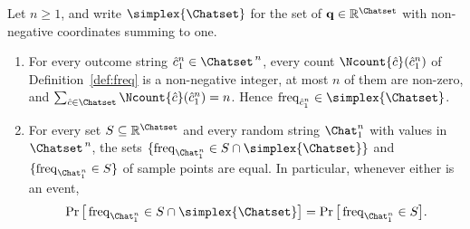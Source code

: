 
\begin{lemma}\label{lem:freq-in-simplex}
Let $n\ge1$, and write $\simplex{\Chatset}$ for the set of
$\mathbf{q}\in\mathbb{R}^{\Chatset}$ with non-negative coordinates summing
to one.
\begin{enumerate}[label=(\roman*),leftmargin=2.2em]
\item For every outcome string $\hat c_1^n\in\Chatset^{\,n}$, every count
$\Ncount{\hat c}(\hat c_1^n)$ of Definition~\ref{def:freq} is a non-negative
integer, at most $n$ of them are non-zero, and
$\sum_{\hat c\in\Chatset}\Ncount{\hat c}(\hat c_1^n)=n$. Hence
$\operatorname{freq}_{\hat c_1^n}\in\simplex{\Chatset}$.
\item For every set $S\subseteq\mathbb{R}^{\Chatset}$ and every random string
$\Chat_1^n$ with values in $\Chatset^{\,n}$, the sets
$\{\operatorname{freq}_{\Chat_1^n}\in S\cap\simplex{\Chatset}\}$ and
$\{\operatorname{freq}_{\Chat_1^n}\in S\}$ of sample points are equal. In
particular, whenever either is an event,
\begin{equation}\label{eq:simplex-free}
  \Pr\big[\operatorname{freq}_{\Chat_1^n}\in S\cap\simplex{\Chatset}\big]
  =\Pr\big[\operatorname{freq}_{\Chat_1^n}\in S\big].
\end{equation}
\end{enumerate}
\end{lemma}

